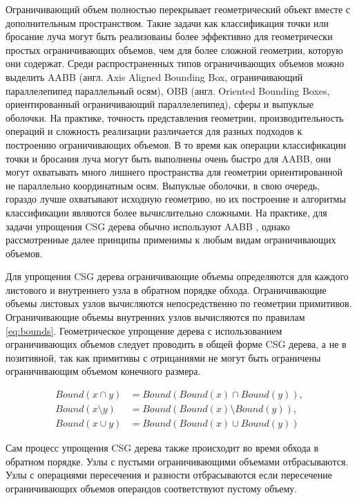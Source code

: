 Ограничивающий объем полностью перекрывает геометрический объект вместе с дополнительным пространством. Такие задачи как классификация точки или бросание луча могут быть реализованы более эффективно для геометрически простых ограничивающих объемов, чем для более сложной геометрии, которую они содержат. Среди распространенных типов ограничивающих объемов можно выделить AABB (англ. Axis Aligned Bounding Box, ограничивающий параллелепипед параллельный осям), OBB (англ. Oriented Bounding Boxes, ориентированный ограничивающий параллелепипед), сферы и выпуклые оболочки. На практике, точность представления геометрии, производительность операций и сложность реализации различается для разных подходов к построению ограничивающих объемов. В то время как операции классификации точки и бросания луча могут быть выполнены очень быстро для AABB, они могут охватывать много лишнего пространства для геометрии ориентированной не параллельно координатным осям. Выпуклые оболочки, в свою очередь, гораздо лучше охватывают исходную геометрию, но их построение и алгоритмы классификации являются более вычислительно сложными. На практике, для задачи упрощения CSG дерева обычно используют AABB , однако рассмотренные далее принципы применимы к любым видам ограничивающих объемов.

Для упрощения CSG дерева ограничивающие объемы определяются для каждого листового и внутреннего узла в обратном порядке обхода. Ограничивающие объемы листовых узлов вычисляются непосредственно по геометрии примитивов. Ограничивающие объемы внутренних узлов вычисляются по правилам \ref{eq:bounds}. Геометрическое упрощение дерева с использованием ограничивающих объемов следует проводить в общей форме CSG дерева, а не в позитивной, так как примитивы с отрицаниями не могут быть ограничены ограничивающим объемом конечного размера. 

\begin{equation}
  \label{eq:bounds}
  \begin{alignedat}{2}
    Bound(x \cap y) & = Bound(Bound(x) \cap Bound(y)), \\
    Bound(x \setminus y) & = Bound(Bound(x) \setminus Bound(y)), \\
    Bound(x \cup y) & = Bound(Bound(x) \cup Bound(y))
  \end{alignedat}
\end{equation}

Сам процесс упрощения CSG дерева также происходит во время обхода в обратном порядке. Узлы с пустыми ограничивающими объемами отбрасываются. Узлы с операциями пересечения и разности отбрасываются если пересечение ограничивающих объемов операндов соответствуют пустому объему.

